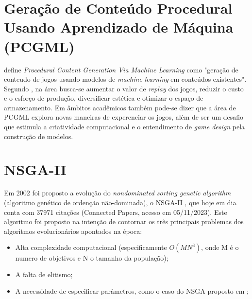 


\section{Geração de Conteúdo Procedural Usando Aprendizado de Máquina (PCGML) }

\citet{survey2018} define \emph{Procedural Content Generation Via Machine Learning} como "geração de conteudo de jogos usando modelos de \emph{machine learning} em conteúdos existentes". Segundo \citep{survey2018}, na área busca-se aumentar o valor de \textit{replay} dos jogos, reduzir o custo e o esforço de produção, diversificar estética e otimizar o espaço de armazenamento. Em âmbitos acadêmicos também pode-se dizer que a área de PCGML explora novas maneiras de experenciar os jogos, além de ser um desafio que estimula a criatividade computacional e o entendimento de \emph{game design} pela construção de modelos.


\section{NSGA-II}

Em 2002 foi proposto a evolução do \textit{nondominated sorting genetic algorithm} (algoritmo genético de ordenção não-dominada), o NSGA-II \cite{Deb:02}, que hoje em dia conta com 37971 citações (Connected Papers, acesso em 05/11/2023). Este algoritmo foi proposto na intenção de contornar os três principais problemas dos algoritmos evolucionários apontados na época:

\begin{itemize}
    \item Alta complexidade computacional (especificamente $O(MN^{3})$, onde M é o numero de objetivos e N o tamanho da população);
    \item A falta de elitismo;
    \item A necessidade de especificar parâmetros, como o caso do NSGA proposto em \cite{Deb:94};
\end{itemize}

